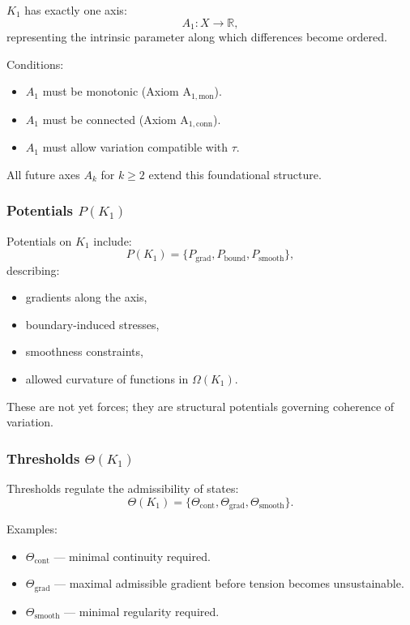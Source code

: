 $K_1$ has exactly one axis:
\[
A_1 : X \to \mathbb{R},
\]
representing the intrinsic parameter along which differences become
ordered.

Conditions:
\begin{itemize}
    \item $A_1$ must be monotonic (Axiom A$_{1,\text{mon}}$).
    \item $A_1$ must be connected (Axiom A$_{1,\text{conn}}$).
    \item $A_1$ must allow variation compatible with $\tau$.
\end{itemize}

All future axes $A_k$ for $k \ge 2$ extend this foundational structure.

\subsubsection{Potentials \texorpdfstring{$P(K_1)$}{P(K_1)}}

Potentials on $K_1$ include:
\[
P(K_1) = \{ P_{\mathrm{grad}}, P_{\mathrm{bound}}, P_{\mathrm{smooth}} \},
\]
describing:
\begin{itemize}
    \item gradients along the axis,
    \item boundary-induced stresses,
    \item smoothness constraints,
    \item allowed curvature of functions in $\Omega(K_1)$.
\end{itemize}

These are not yet forces; they are structural potentials governing
coherence of variation.

\subsubsection{Thresholds \texorpdfstring{$\Theta(K_1)$}{\Theta(K_1)}}

Thresholds regulate the admissibility of states:
\[
\Theta(K_1) = \{ \Theta_{\mathrm{cont}}, \Theta_{\mathrm{grad}},
                 \Theta_{\mathrm{smooth}} \}.
\]

Examples:
\begin{itemize}
    \item $\Theta_{\mathrm{cont}}$ — minimal continuity required.
    \item $\Theta_{\mathrm{grad}}$ — maximal admissible gradient before
          tension becomes unsustainable.
    \item $\Theta_{\mathrm{smooth}}$ — minimal regularity required.
\end{itemize}

